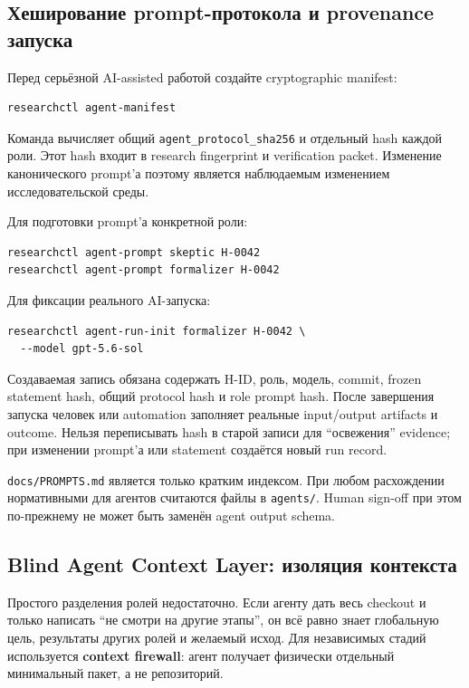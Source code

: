 \documentclass[11pt,a4paper]{article}
\begin{document}
\subsection{Хеширование prompt-протокола и provenance запуска}

Перед серьёзной AI-assisted работой создайте cryptographic manifest:

\begin{lstlisting}
researchctl agent-manifest
\end{lstlisting}

Команда вычисляет общий \texttt{agent\_protocol\_sha256} и отдельный hash каждой роли. Этот hash входит в research fingerprint и verification packet. Изменение канонического prompt'а поэтому является наблюдаемым изменением исследовательской среды.

Для подготовки prompt'а конкретной роли:

\begin{lstlisting}
researchctl agent-prompt skeptic H-0042
researchctl agent-prompt formalizer H-0042
\end{lstlisting}

Для фиксации реального AI-запуска:

\begin{lstlisting}
researchctl agent-run-init formalizer H-0042 \
  --model gpt-5.6-sol
\end{lstlisting}

Создаваемая запись обязана содержать H-ID, роль, модель, commit, frozen statement hash, общий protocol hash и role prompt hash. После завершения запуска человек или automation заполняет реальные input/output artifacts и outcome. Нельзя переписывать hash в старой записи для ``освежения'' evidence; при изменении prompt'а или statement создаётся новый run record.

\begin{warningbox}
\texttt{docs/PROMPTS.md} является только кратким индексом. При любом расхождении нормативными для агентов считаются файлы в \texttt{agents/}. Human sign-off при этом по-прежнему не может быть заменён agent output schema.
\end{warningbox}


\subsection{Blind Agent Context Layer: изоляция контекста}

Простого разделения ролей недостаточно. Если агенту дать весь checkout и только написать ``не смотри на другие этапы'', он всё равно знает глобальную цель, результаты других ролей и желаемый исход. Для независимых стадий используется \textbf{context firewall}: агент получает физически отдельный минимальный пакет, а не репозиторий.
\end{document}
